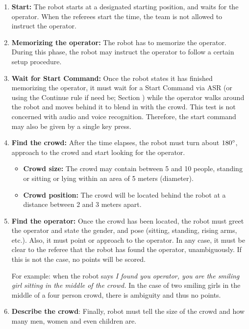 \begin{enumerate}

\item \textbf{Start:} The robot starts at a designated starting position, and waits for the  operator. 
  When the referees start the time, the team is not allowed to instruct the operator.
\item \textbf{Memorizing the operator:} The robot has to memorize the operator. 
  During this phase, the robot may instruct the operator to follow a certain setup procedure.
\item \textbf{Wait for Start Command:} Once the robot states it has finished memorizing the operator, 
  it must wait for a Start Command via ASR (or using the Continue rule if need be; Section ) while the operator walks around the robot and moves behind it to blend in with the crowd.
  This test is not concerned with audio and voice recognition. Therefore, the start command may also be given by a single key press.
\item \textbf{Find the crowd:} After the time elapses, the robot must turn about $180\degree$, approach to the crowd and start looking for the operator.
\begin{itemize}
\item \textbf{Crowd size:} The crowd may contain between 5 and 10 people, standing or sitting or lying within an  area of 5 meters (diameter).
\item \textbf{Crowd position:} The crowd will be located behind the robot at a distance between 2 and 3 meters apart.
\end{itemize}
\item \textbf{Find the operator:} Once the crowd has been located, the robot must greet the operator and state the gender, and pose (sitting, standing, rising arms, etc.). 
  Also, it must point or approach to the operator. In any case, it must be clear to the referee that the robot has found the operator, unambiguously.
  If this is not the case, no points will be scored. 

  For example: when the robot says \textit{I found you operator, you are the smiling girl sitting in the middle of the crowd.}
  In the case of two smiling girls in the middle of a four person crowd, there is ambiguity and thus no points.

\item \textbf{Describe the crowd}: Finally, robot must tell the size of the crowd and how many men, women and even children are.
\end{enumerate}

